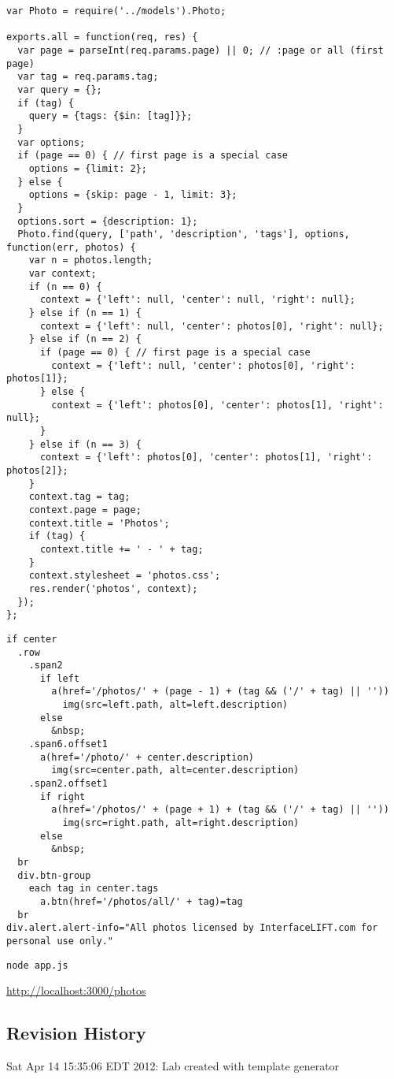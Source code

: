 \documentclass{article}
\begin{document}
\begin{verbatim}
var Photo = require('../models').Photo;

exports.all = function(req, res) {
  var page = parseInt(req.params.page) || 0; // :page or all (first page)
  var tag = req.params.tag;
  var query = {};
  if (tag) {
    query = {tags: {$in: [tag]}};
  }
  var options;
  if (page == 0) { // first page is a special case
    options = {limit: 2};
  } else {
    options = {skip: page - 1, limit: 3};
  }
  options.sort = {description: 1};
  Photo.find(query, ['path', 'description', 'tags'], options, function(err, photos) {
    var n = photos.length;
    var context;
    if (n == 0) {
      context = {'left': null, 'center': null, 'right': null};
    } else if (n == 1) {
      context = {'left': null, 'center': photos[0], 'right': null};
    } else if (n == 2) {
      if (page == 0) { // first page is a special case
        context = {'left': null, 'center': photos[0], 'right': photos[1]};
      } else {
        context = {'left': photos[0], 'center': photos[1], 'right': null};
      }
    } else if (n == 3) {
      context = {'left': photos[0], 'center': photos[1], 'right': photos[2]};
    }
    context.tag = tag;
    context.page = page;
    context.title = 'Photos';
    if (tag) {
      context.title += ' - ' + tag;
    }
    context.stylesheet = 'photos.css';
    res.render('photos', context);
  });
};
\end{verbatim}


\begin{verbatim}
if center
  .row
    .span2
      if left
        a(href='/photos/' + (page - 1) + (tag && ('/' + tag) || ''))
          img(src=left.path, alt=left.description)
      else
        &nbsp;
    .span6.offset1
      a(href='/photo/' + center.description)
        img(src=center.path, alt=center.description)
    .span2.offset1
      if right
        a(href='/photos/' + (page + 1) + (tag && ('/' + tag) || ''))
          img(src=right.path, alt=right.description)
      else
        &nbsp;
  br
  div.btn-group
    each tag in center.tags
      a.btn(href='/photos/all/' + tag)=tag
  br
div.alert.alert-info="All photos licensed by InterfaceLIFT.com for personal use only."
\end{verbatim}

\verb!node app.js!

\href{http://localhost:3000/photos}{http://localhost:3000/photos}



\subsection*{Revision History}
\begin{itemize*}
 \item Sat Apr 14 15:35:06 EDT 2012: Lab created with template generator
\end{itemize*}
\end{document}
